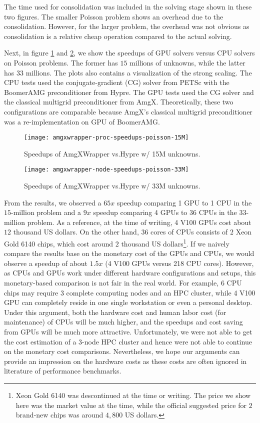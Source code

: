 The time used for consolidation was included in the solving stage shown in these two figures.
The smaller Poisson problem shows an overhead due to the consolidation.
However, for the larger problem, the overhead was not obvious as consolidation is a relative cheap operation compared to the actual solving. 

Next, in figure \ref{fig:amgxwrapper-speedups-15M} and \ref{fig:amgxwrapper-speedups-33M}, we show the speedups of GPU solvers versus CPU solvers on Poisson problems.
The former has $15$ millions of unknowns, while the latter has $33$ millions.
The plots also contains a visualization of the strong scaling.
The CPU tests used the conjugate-gradient (CG) solver from PETSc with the BoomerAMG preconditioner from Hypre.
The GPU tests used the CG solver and the classical multigrid preconditioner from AmgX.
Theoretically, these two configurations are comparable because AmgX's classical multigrid preconditioner was a re-implementation on GPU of BoomerAMG. 

\begin{figure}[H]
    \texttt{[image: amgxwrapper-proc-speedups-poisson-15M]}
    \caption{Speedups of AmgXWrapper vs.\@ Hypre w/ 15M unknowns.}
    \label{fig:amgxwrapper-speedups-15M}
\end{figure}

\begin{figure}[H]
    \texttt{[image: amgxwrapper-node-speedups-poisson-33M]}
    \caption{Speedups of AmgXWrapper vs.\@ Hypre w/ 33M unknowns.}
    \label{fig:amgxwrapper-speedups-33M}
\end{figure}

From the results, we observed a $65x$ speedup comparing 1 GPU to 1 CPU in the $15$-million problem and a $9x$ speedup comparing 4 GPUs to 36 CPUs in the $33$-million problem.
As a reference, at the time of writing, 4 V100 GPUs cost about $12$ thousand US dollars.
On the other hand, $36$ cores of CPUs consists of $2$ Xeon Gold 6140 chips, which cost around $2$ thousand US dollars\footnote{Xeon Gold 6140 was descontinued at the time or writing. The price we show here was the market value at the time, while the official suggested price for $2$ brand-new chips was around $4,800$ US dollars.}.
If we naively compare the results base on the monetary cost of the GPUs and CPUs, we would observe a speedup of about $1.5x$ (4 V100 GPUs versus 218 CPU cores).
However, as CPUs and GPUs work under different hardware configurations and setups, this monetary-based comparison is not fair in the real world.
For example, $6$ CPU chips may require $3$ complete computing nodes and an HPC cluster, while 4 V100 GPU can completely reside in one single workstation or even a personal desktop.
Under this argument, both the hardware cost and human labor cost (for maintenance) of CPUs will be much higher, and the speedups and cost saving from GPUs will be much more attractive.
Unfortunately, we were not able to get the cost estimation of a $3$-node HPC cluster and hence were not able to continue on the monetary cost comparisons.
Nevertheless, we hope our arguments can provide an impression on the hardware costs as these costs are often ignored in literature of performance benchmarks.

